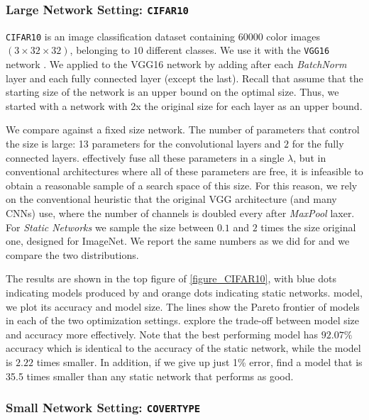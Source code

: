 \subsubsection{Large Network Setting: \texttt{CIFAR10}}


\texttt{CIFAR10} is an image classification dataset containing $60000$ color
images $(3 \times 32 \times 32)$, belonging to $10$ different classes. We use it
with the \texttt{VGG16} network \cite{Srivastava2014}. We applied \shrink to the
VGG16 network by adding \swls after each \textit{BatchNorm} layer and each fully
connected layer (except the last). Recall that \shrink assume that the starting
size of the network is an upper bound on the optimal size. Thus, we started with
a network with 2x the original size for each layer as an upper bound.

We compare against a fixed size network. The
number of parameters that control the size is large: 13 parameters for the
convolutional layers and $2$ for the fully connected layers. \shrink
effectively fuse all these parameters in a single $\lambda$, but in conventional
architectures where all of these parameters are free, it is infeasible to obtain
a reasonable sample of a search space of this size. For this reason, we rely on
the conventional heuristic that the original VGG architecture (and many CNNs)
use, where the number of channels is doubled every after \textit{MaxPool} laxer.
For \textit{Static Networks} we sample the size between $0.1$ and $2$ times the size
original one, designed for ImageNet. We report the same numbers as we did for
\shrink and we compare the two distributions.

The results are shown in the top figure of \cref{figure_CIFAR10}, with blue dots
indicating models produced by \shrink and orange dots indicating static
networks.  model, we plot its accuracy and model size. The lines show the Pareto
frontier of models in each of the two optimization settings. \shrink explore the
trade-off between model size and accuracy more effectively. Note that the best
performing \shrink model has $92.07\%$ accuracy which is identical to the
accuracy of the static network, while the \shrink model is $2.22$ times smaller.
In addition, if we give up just 1\% error, \shrink find a model that is 35.5
times smaller than any static network that performs as good.

\subsubsection{Small Network Setting: \texttt{COVERTYPE}}

